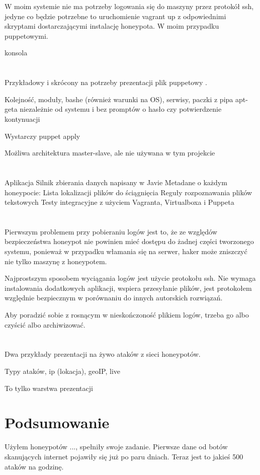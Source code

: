 \documentclass[runningheads,a4paper]{llncs}
\begin{document}
W moim systemie nie ma potrzeby logowania się do maszyny przez protokół ssh, jedyne co będzie potrzebne to uruchomienie vagrant up z odpowiednimi skryptami dostarczającymi instalację honeypota. W moim przypadku puppetowymi.

konsola
\section{}
Przykładowy i skrócony na potrzeby prezentacji plik puppetowy .

Kolejność, moduły, bashe (również warunki na OS), serwisy, paczki z pipa apt-geta niezależnie od systemu i bez promptów o hasło czy potwierdzenie kontynuacji

Wystarczy puppet apply

Możliwa architektura master-slave, ale nie używana w tym projekcie

\section{}
Aplikacja
Silnik zbierania danych napisany w Javie
Metadane o każdym honeypocie:
Lista lokalizacji plików do ściągnięcia
Reguły rozpoznawania plików tekstowych
Testy integracyjne z użyciem Vagranta, Virtualboxa i Puppeta
\section{}
Pierwszym problemem przy pobieraniu logów jest to, że ze względów bezpieczeństwa honeypot nie powinien mieć dostępu do żadnej części tworzonego systemu, ponieważ w przypadku włamania się na serwer, haker może zniszczyć nie tylko maszynę z honeypotem.

Najprostszym sposobem wyciągania logów jest użycie protokołu ssh. Nie wymaga instalowania dodatkowych aplikacji, wspiera przesyłanie plików, jest protokołem względnie bezpiecznym w porównaniu do innych autorskich rozwiązań.

Aby poradzić sobie z rosnącym w nieskończoność plikiem logów, trzeba go albo czyścić albo archiwizować.

\section{}
Dwa przykłady prezentacji na żywo ataków z sieci honeypotów.

Typy ataków, ip (lokacja), geoIP, live

To tylko warstwa prezentacji
\section{Podsumowanie}
Użyłem honeypotów ..., spełniły swoje zadanie. Pierwsze dane od botów skanujących internet pojawiły się już po paru dniach. Teraz jest to jakieś 500 ataków na godzinę.
\end{document}
